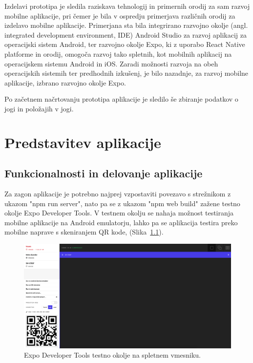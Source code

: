 \documentclass[a4paper, 12pt]{book}
\begin{document}
Izdelavi prototipa je sledila raziskava tehnologij in primernih orodij za sam razvoj mobilne aplikacije, pri čemer je bila v ospredju primerjava različnih orodij za izdelavo mobilne aplikacije. Primerjana sta bila integrirano razvojno okolje (angl. integrated development environment, IDE) Android Studio za razvoj aplikacij za operacijski sistem Android, ter razvojno okolje Expo, ki z uporabo React Native platforme in orodij, omogoča razvoj tako spletnih, kot mobilnih aplikacij na operacijskem sistemu Android in iOS. Zaradi možnosti razvoja na obeh operacijskih sistemih ter predhodnih izkušenj, je bilo nazadnje, za razvoj mobilne aplikacije, izbrano razvojno okolje Expo.

Po začetnem načrtovanju prototipa aplikacije je sledilo še zbiranje podatkov o jogi in položajih v jogi. 


\chapter{Predstavitev aplikacije}
\label{ch3}
\section{Funkcionalnosti in delovanje aplikacije}
Za zagon aplikacije je potrebno najprej vzpostaviti povezavo s strežnikom z ukazom "npm run server", nato pa se z ukazom "npm web build" zažene testno okolje Expo Developer Tools. V testnem okolju se nahaja možnost testiranja mobilne aplikacije na Android emulatorju, lahko pa se aplikacija testira preko mobilne naprave s skeniranjem QR kode, (Slika~\ref{reactDevTools}).
  
\begin{figure}[ht]
\centering
  \begin{minipage}[b]{1\textwidth}
    \includegraphics[width=\textwidth]{expodeveloper.png}\centering
  \end{minipage}
    \caption{Expo Developer Tools testno okolje na spletnem vmesniku.}
    \label{reactDevTools}
\end{figure}
\end{document}
